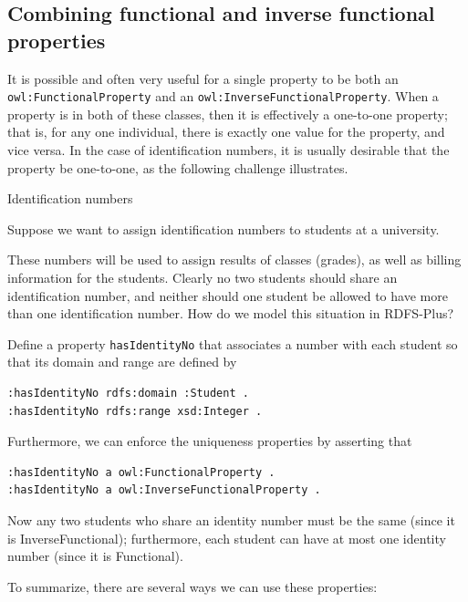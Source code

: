 \subsection{Combining functional and inverse functional properties}

It is possible and often very useful for a single property to be both an
\texttt{owl:FunctionalProperty} and an \texttt{owl:InverseFunctionalProperty}. When a
property is in both of these classes, then it is effectively a
one-to-one property; that is, for any one individual, there is exactly
one value for the property, and vice versa. In the case of
identification numbers, it is usually desirable that the property be
one-to-one, as the following challenge illustrates.

\begin{challenge}{Identification numbers}

Suppose we want to assign identification numbers to students at a
university.

These numbers will be used to assign results of classes (grades), as
well as billing information for the students. Clearly no two students
should share an identification number, and neither should one student be
allowed to have more than one identification number. How do we model
this situation in RDFS-Plus?

\solution

Define a property \texttt{hasIdentityNo} that associates a number with each
student so that its domain and range are defined by

\begin{lstlisting}
:hasIdentityNo rdfs:domain :Student .
:hasIdentityNo rdfs:range xsd:Integer .
\end{lstlisting}

Furthermore, we can enforce the uniqueness properties by asserting that

\begin{lstlisting}
:hasIdentityNo a owl:FunctionalProperty .
:hasIdentityNo a owl:InverseFunctionalProperty .
\end{lstlisting}

Now any two students who share an identity number must be the same
(since it is InverseFunctional);
furthermore, each student can have at most one identity number (since it
is Functional).
\end{challenge}

To summarize, there are several ways we can use these properties:

